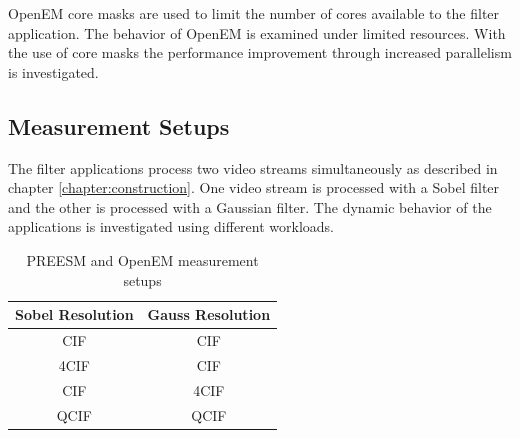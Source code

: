 OpenEM core masks are used to limit the number of cores available to the filter application. The behavior of OpenEM is examined under limited resources. With the use of core masks the performance improvement through increased parallelism is investigated.

\subsection{Measurement Setups}
\label{subsec:measurement-setups}
The filter applications process two video streams simultaneously as described in chapter \ref{chapter:construction}. One video stream is processed with a Sobel filter and the other is processed with a Gaussian filter. The dynamic behavior of the applications is investigated using different workloads.

\begin{table}
    \begin{center}
        \begin{tabular}{ c c }
            Sobel Resolution & Gauss Resolution \\ \hline
            CIF              & CIF              \\ \hline
            4CIF             & CIF              \\ \hline
            CIF              & 4CIF             \\ \hline
            QCIF             & QCIF             \\ \hline
        \end{tabular}
        \caption{PREESM and OpenEM measurement setups}
        \label{tab:preesm_setups}
    \end{center}
\end{table}

